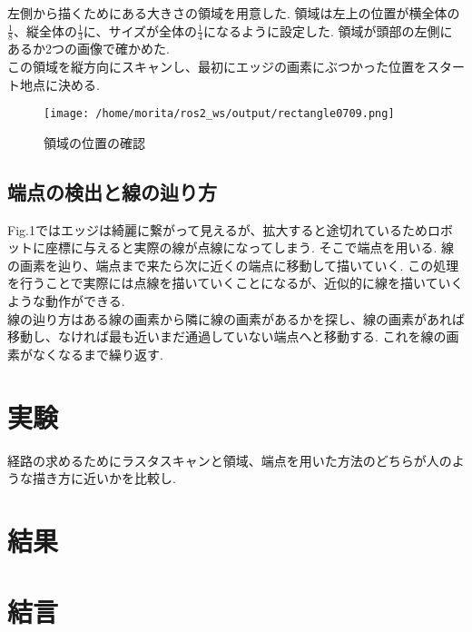 \documentclass[10pt]{jarticle}
\begin{document}
	左側から描くためにある大きさの領域を用意した.
	領域は左上の位置が横全体の$\frac{1}{8}$、縦全体の$\frac{1}{3}$に、サイズが全体の$\frac{1}{4}$になるように設定した.
	領域が頭部の左側にあるか2つの画像で確かめた.
	\\この領域を縦方向にスキャンし、最初にエッジの画素にぶつかった位置をスタート地点に決める.

    \begin{center}
        \begin{figure}[h]
            \texttt{[image: /home/morita/ros2\_ws/output/rectangle0709.png]}
            \caption{領域の位置の確認}
            \label{the position of a region}
        \end{figure}
    \end{center}
	

	\subsection{端点の検出と線の辿り方}
	Fig.1ではエッジは綺麗に繋がって見えるが、拡大すると途切れているためロボットに座標に与えると実際の線が点線になってしまう.
	そこで端点を用いる.
	線の画素を辿り、端点まで来たら次に近くの端点に移動して描いていく.
	この処理を行うことで実際には点線を描いていくことになるが、近似的に線を描いていくような動作ができる.
  \\ 
	線の辿り方はある線の画素から隣に線の画素があるかを探し、線の画素があれば移動し、なければ最も近いまだ通過していない端点へと移動する.
	これを線の画素がなくなるまで繰り返す.
	


	\section{実験}

	経路の求めるためにラスタスキャンと領域、端点を用いた方法のどちらが人のような描き方に近いかを比較し.

    
	\section{結果}
    
	\section{結\hspace{2zw}言}%
   
\end{document}
